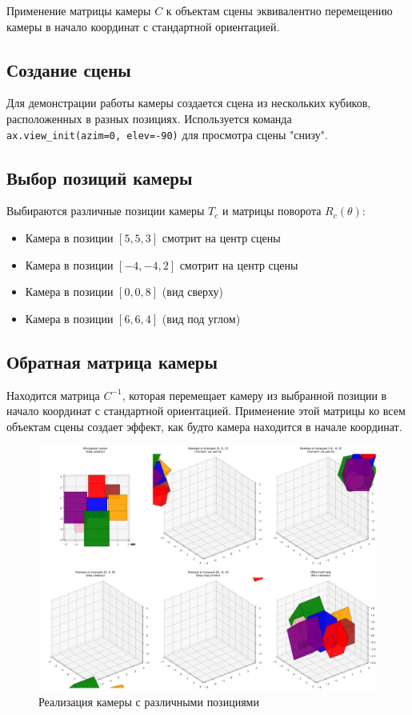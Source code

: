 Применение матрицы камеры $C$ к объектам сцены эквивалентно перемещению камеры в начало координат с стандартной ориентацией.

\subsection*{Создание сцены}

Для демонстрации работы камеры создается сцена из нескольких кубиков, расположенных в разных позициях. Используется команда \texttt{ax.view\_init(azim=0, elev=-90)} для просмотра сцены "снизу".

\subsection*{Выбор позиций камеры}

Выбираются различные позиции камеры $T_c$ и матрицы поворота $R_c(\theta)$:
\begin{itemize}
\item Камера в позиции $[5, 5, 3]$ смотрит на центр сцены
\item Камера в позиции $[-4, -4, 2]$ смотрит на центр сцены  
\item Камера в позиции $[0, 0, 8]$ (вид сверху)
\item Камера в позиции $[6, 6, 4]$ (вид под углом)
\end{itemize}

\subsection*{Обратная матрица камеры}

Находится матрица $C^{-1}$, которая перемещает камеру из выбранной позиции в начало координат с стандартной ориентацией. Применение этой матрицы ко всем объектам сцены создает эффект, как будто камера находится в начале координат.

\begin{figure}[h]
\centering
\includegraphics[width=\textwidth]{images/task6/camera_implementations.png}
\caption{Реализация камеры с различными позициями}
\label{fig:camera_implementations}
\end{figure}

